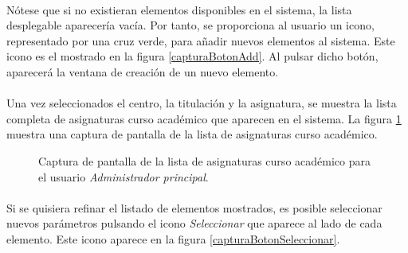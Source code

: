   \paragraph{}Nótese que si no existieran elementos disponibles en el sistema,
  la lista desplegable aparecería vacía. Por tanto, se proporciona al usuario
  un icono, representado por una cruz verde, para añadir nuevos elementos al
  sistema. Este icono es el mostrado en la figura \ref{capturaBotonAdd}. Al
  pulsar dicho botón, aparecerá la ventana de creación de un nuevo elemento.

  \paragraph{}Una vez seleccionados el centro, la titulación y la asignatura, se
  muestra la lista completa de asignaturas curso académico que aparecen en el
  sistema. La figura \ref{capturaPantallaListaAsignaturasCAAdminPrincipal}
  muestra una captura de pantalla de la lista de asignaturas curso académico.

  \begin{figure}[!ht]
    \begin{center}
      \caption{Captura de pantalla de la lista de asignaturas curso académico para el usuario \textit{Administrador principal}.}
      \label{capturaPantallaListaAsignaturasCAAdminPrincipal}
    \end{center}
  \end{figure}

  \paragraph{}Si se quisiera refinar el listado de elementos mostrados, es
  posible seleccionar nuevos parámetros pulsando el icono \textit{Seleccionar}
  que aparece al lado de cada elemento. Este icono aparece en la figura
  \ref{capturaBotonSeleccionar}.
